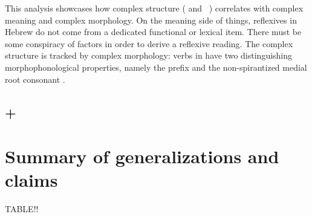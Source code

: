 {%

\vspace{2em}

This analysis showcases how complex structure ({\vz} and {\va}~\!) correlates with complex meaning and complex morphology. On the meaning side of things, reflexives in Hebrew do not come from a dedicated functional or lexical item. There must be some conspiracy of factors in order to derive a reflexive reading. The complex structure is tracked by complex morphology: verbs in {\thit} have two distinguishing morphophonological properties, namely the prefix and the non-spirantized medial root consonant .



	\subsection{{\vz} + {\pz}} \label{vz:va:pzva}

				
\section{Summary of generalizations and claims} \label{vz:sum}

TABLE!!


}
